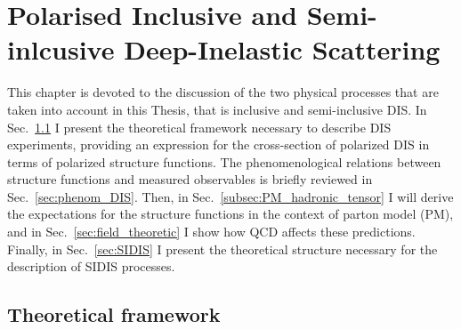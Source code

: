 \chapter{Polarised Inclusive and Semi-inlcusive Deep-Inelastic Scattering}
\label{ch:2}

This chapter is devoted to the discussion of the two physical processes that are taken into account in this Thesis, that is inclusive and semi-inclusive DIS. In Sec.~\ref{sec:theo_fram} I present the theoretical framework necessary to describe DIS experiments, providing an expression for the cross-section of polarized DIS in terms of polarized structure functions. The phenomenological relations between structure functions and measured observables is briefly reviewed in Sec.~\ref{sec:phenom_DIS}. Then, in Sec.~\ref{subsec:PM_hadronic_tensor} I will derive the expectations for the structure functions in the context of parton model (PM), and in Sec.~\ref{sec:field_theoretic} I show how QCD affects these predictions. Finally, in Sec.~\ref{sec:SIDIS} I present the theoretical structure necessary for the description of SIDIS processes.

\section{Theoretical framework}
\label{sec:theo_fram}

